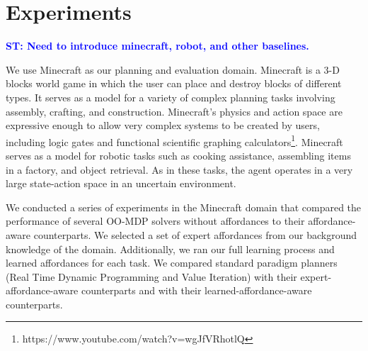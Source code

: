 \documentclass[conference]{IEEEtran}
\newcommand{\stnote}[1]{\textcolor{Blue}{\textbf{ST: #1}}}
\begin{document}

\section{Experiments}
\label{sec:experiments}

\stnote{Need to introduce minecraft, robot, and other baselines.}

We use Minecraft as our planning and evaluation domain. Minecraft is a
 3-D blocks world game in which the user can place and destroy blocks
 of different types. It serves as a model for a variety of complex planning tasks involving 
 assembly, crafting, and construction.  Minecraft's physics and action space are expressive
 enough to allow very complex systems to be created by users, including logic gates and 
 functional scientific graphing calculators\footnote{https://www.youtube.com/watch?v=wgJfVRhotlQ}.
 Minecraft serves as a model for robotic tasks such as cooking assistance, assembling items in a factory, 
 and object retrieval.  As in these tasks, the agent operates in a very large state-action space in an uncertain environment.

We conducted a series of experiments in the Minecraft domain that
compared the performance of several OO-MDP solvers without affordances
to their affordance-aware counterparts. We selected a set of expert
affordances from our background knowledge of the domain. Additionally, we ran our full
learning process and learned affordances for each
task. We compared standard paradigm planners (Real Time Dynamic
Programming and Value Iteration) with their expert-affordance-aware
counterparts and with their learned-affordance-aware counterparts.
\end{document}
